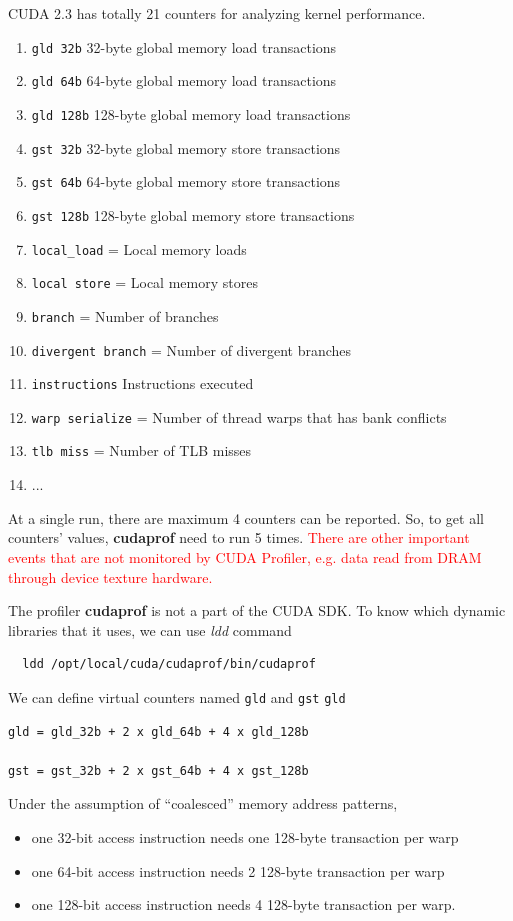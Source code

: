 CUDA 2.3 has totally 21 counters for analyzing kernel performance.
\begin{enumerate}
\item \verb!gld 32b! 32-byte global memory load transactions
\item  \verb!gld 64b! 64-byte global memory load transactions
\item  \verb!gld 128b! 128-byte global memory load transactions
\item  \verb!gst 32b! 32-byte global memory store transactions
\item  \verb!gst 64b! 64-byte global memory store transactions
\item  \verb!gst 128b! 128-byte global memory store transactions
\item  \verb!local_load! = Local memory loads
\item  \verb!local store! =  Local memory stores
\item  \verb!branch! =  Number of branches
\item  \verb!divergent branch! =  Number of divergent branches
\item  \verb!instructions! Instructions executed
\item \verb!warp serialize! = Number of thread warps that has bank
  conflicts
\item  \verb!tlb miss! =  Number of TLB misses
\item ...
\end{enumerate}
At a single run, there are maximum 4 counters can be reported.  So, to
get all counters' values, {\bf cudaprof} need to run 5 times.
\textcolor{red}{ There are other important events that are not
  monitored by CUDA Profiler, e.g. data read from DRAM through device
  texture hardware.}

\begin{framed}
  The profiler {\bf cudaprof} is not a part of the CUDA SDK. To know
  which dynamic libraries that it uses, we can use {\it ldd} command
\begin{lstlisting}
  ldd /opt/local/cuda/cudaprof/bin/cudaprof
\end{lstlisting}

\end{framed}

We can define virtual counters named \verb!gld! and \verb!gst!
\verb!gld!~\citep{nagasaka2010}
\begin{verbatim}
gld = gld_32b + 2 x gld_64b + 4 x gld_128b

gst = gst_32b + 2 x gst_64b + 4 x gst_128b
\end{verbatim}
Under the assumption of ``coalesced'' memory address patterns, 
\begin{itemize}
\item one 32-bit access instruction needs one 128-byte transaction per
  warp
\item one 64-bit access instruction needs 2 128-byte transaction per
  warp
\item one 128-bit access instruction needs 4 128-byte transaction per
  warp.
\end{itemize}

